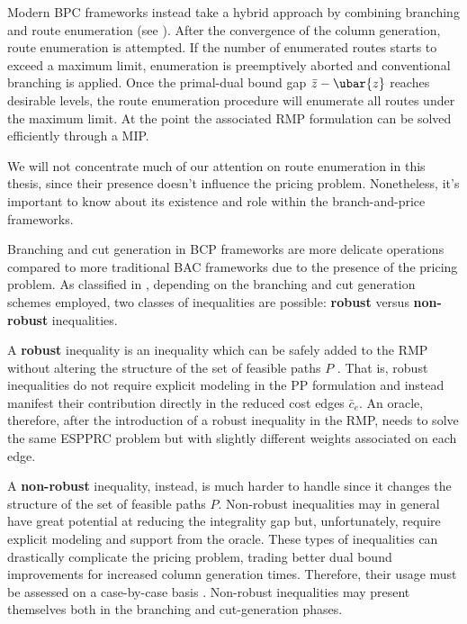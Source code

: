 Modern BPC frameworks instead take a hybrid approach by combining branching and route enumeration
(see \cite{pessoa2008, pessoa2009,contardo2014,pecin2017improved,pecin2017new,pessoa2020}).
After the convergence of the column generation, route enumeration is attempted.
If the number of enumerated routes starts to exceed a maximum limit, enumeration
is preemptively aborted and conventional branching is applied.
Once the primal-dual bound gap $\bar{z} - \ubar{z}$ reaches desirable levels, the route enumeration
procedure will enumerate all routes under the maximum limit.
At the point the associated RMP formulation can be solved efficiently through a MIP.

We will not concentrate much of our attention on route enumeration in this
thesis, since their presence doesn't influence the pricing problem.
Nonetheless, it's important to know about its existence and role within
the branch-and-price frameworks.

\medskip

Branching and cut generation in BCP frameworks are more delicate operations
compared to more traditional BAC frameworks due to the presence of the pricing problem.
As classified in \textcite{dearagao2003},
depending on the branching and cut generation schemes employed,
two classes of inequalities are possible:
\textbf{robust} versus \textbf{non-robust} inequalities.

A \textbf{robust} inequality is an inequality
which can be safely added to the RMP
without altering the structure of the set of feasible paths $P$ \parencite{fukasawa2006}.
That is,
robust inequalities do not require explicit modeling in the PP formulation
and instead manifest their contribution directly in the reduced cost edges $\bar{c}_e$.
An oracle, therefore,
after the introduction of a robust inequality in the RMP,
needs to solve the same ESPPRC problem but with slightly different weights associated on each edge.

A \textbf{non-robust} inequality, instead,
is much harder to handle since it changes the structure of the set of feasible paths $P$.
Non-robust inequalities may in general have great potential at reducing the integrality gap
but,
unfortunately, require explicit modeling and support from the oracle.
These types of inequalities can drastically complicate the pricing problem,
trading better dual bound improvements for increased column generation times.
Therefore, their usage must be assessed on a case-by-case basis \parencite{desaulniers2011}.
Non-robust inequalities may present themselves both in the branching and cut-generation phases.

